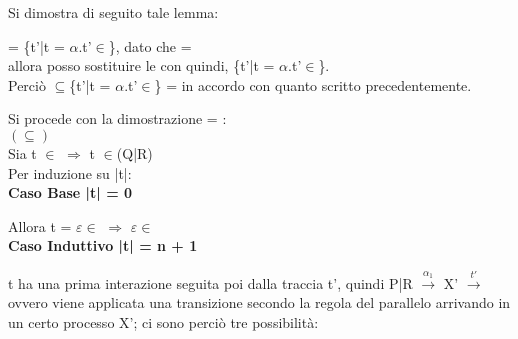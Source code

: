 Si dimostra di seguito tale lemma:

 = \{t'|t = $\alpha$.t'$\in$\}, dato che  =  \\
allora posso sostituire le  con  quindi, \{t'|t = $\alpha$.t'$\in$\}.\\
Perciò $\subseteq$\{t'|t = $\alpha$.t'$\in$\} =  in accordo con quanto scritto precedentemente.

Si procede con la dimostrazione  = :\\

$(\subseteq)$ 
\\

Sia t $\in$  $\Rightarrow$  t $\in$(Q|R)\\
Per induzione su |t|:\\

\textbf{Caso Base |t| = 0}

Allora t = $\varepsilon \in$ $\Rightarrow$ $\varepsilon \in$
\\

\textbf{Caso Induttivo |t| = n + 1}

t ha una prima interazione seguita poi dalla traccia t', quindi P|R $ \overset{\alpha_{1}}\rightarrow $ X' $\overset{t'}\rightarrow$ ovvero viene applicata una transizione secondo la regola del parallelo arrivando in un certo processo X'; ci sono perciò tre possibilità:

